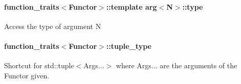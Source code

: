 \paragraph*{{\ttfamily function\+\_\+traits$<$Functor$>$\+::template arg$<$N$>$\+::type}}

Access the type of argument {\ttfamily N}

\paragraph*{{\ttfamily function\+\_\+traits$<$Functor$>$\+::tuple\+\_\+type}}

Shortcut for {\ttfamily std\+::tuple$<$Args...$>$} where {\ttfamily Args...} are the arguments of the Functor given. 